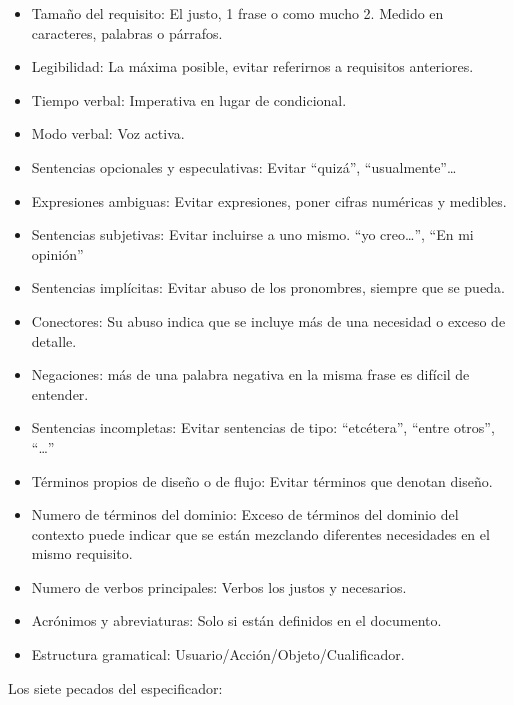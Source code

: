 \documentclass[12pt, twoside, openright]{report} %
\begin{document}
    \begin{itemize}
    
    \item
      Tamaño del requisito: El justo, 1 frase o como mucho 2. Medido en
      caracteres, palabras o párrafos.
    \item
      Legibilidad: La máxima posible, evitar referirnos a requisitos
      anteriores.
    \item
      Tiempo verbal: Imperativa en lugar de condicional.
    \item
      Modo verbal: Voz activa.
    \item
      Sentencias opcionales y especulativas: Evitar ``quizá'',
      ``usualmente''\ldots{}
    \item
      Expresiones ambiguas: Evitar expresiones, poner cifras numéricas y
      medibles.
    \item
      Sentencias subjetivas: Evitar incluirse a uno mismo. ``yo
      creo\ldots{}'', ``En mi opinión''
    \item
      Sentencias implícitas: Evitar abuso de los pronombres, siempre que
      se pueda.
    \item
      Conectores: Su abuso indica que se incluye más de una necesidad o
      exceso de detalle.
    \item
      Negaciones: más de una palabra negativa en la misma frase es
      difícil de entender.
    \item
      Sentencias incompletas: Evitar sentencias de tipo: ``etcétera'',
      ``entre otros'', ``\ldots{}''
    \item
      Términos propios de diseño o de flujo: Evitar términos que denotan
      diseño.
    \item
      Numero de términos del dominio: Exceso de términos del dominio del
      contexto puede indicar que se están mezclando diferentes
      necesidades en el mismo requisito.
    \item
      Numero de verbos principales: Verbos los justos y necesarios.
    \item
      Acrónimos y abreviaturas: Solo si están definidos en el documento.
    \item
      Estructura gramatical: Usuario/Acción/Objeto/Cualificador.
    \end{itemize}

	Los siete pecados del especificador:
\end{document}
